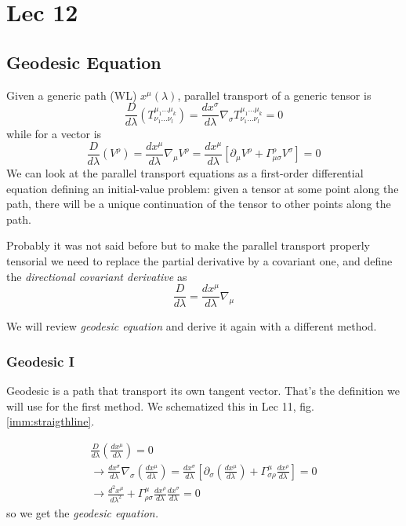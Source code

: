 \section{Lec 12}
\subsection{Geodesic Equation}
Given a generic path (WL) $x^{\mu }\left( \lambda  \right)$, parallel transport of a generic tensor is
\[
\frac{D}{d\lambda } \left( T^{\mu _{1}\ldots \mu _{k}}_{\nu _{1}\ldots \nu _{l}}\right) =\frac{d x^{\sigma }}{d \lambda } \nabla _{\sigma } T^{\mu _{1}\ldots \mu _{k}}_{\nu _{1}\ldots \nu _{l}} = 0		
\]
while for a vector is 
\[
	\frac{D}{d\lambda } \left( V^{\rho } \right) = \frac{d x^{\mu }}{d \lambda } \nabla _{\mu }V^{\rho } = \frac{d x^{\mu }}{d \lambda } \left[ \partial_{\mu }V^{\rho } + \Gamma ^{\rho }_{\mu \sigma  } V^{\sigma } \right]=0
\]
We can look at the parallel transport equations as a first-order differential equation defining an initial-value problem: given a tensor at some point along the path, there will be a unique continuation of the tensor to other points along the path.

Probably it was not said before but to make the parallel transport properly tensorial we need to replace the partial derivative by a covariant one, and define the \emph{directional covariant derivative} as
\[
\frac{D}{d\lambda } = \frac{d x^{\mu }}{d \lambda }\nabla _{\mu }
\]

We will review \emph{geodesic equation} and derive it again with a different method.

\subsubsection{Geodesic I}
Geodesic is a path that transport its own tangent vector. That's the definition we will use for the first method. We schematized this in Lec 11, fig. \ref{imm:straigthline}.

\begin{gather*}
\frac{D}{d\lambda } \left( \frac{d x^{\mu }}{d \lambda } \right) = 0 \\
\to  \frac{d x^{\sigma }}{d \lambda }\nabla _{\sigma }\left( \frac{d x^{\mu }}{d \lambda } \right) = \frac{d x^{\sigma }}{d \lambda }\left[ \partial_{\sigma } \left( \frac{d x^{\mu }}{d \lambda } \right) + \Gamma ^{\mu }_{\sigma \rho } \frac{d x^{\rho }}{d \lambda } \right] = 0 \\
\to \frac{d ^{2} x^{\mu }}{d \lambda ^{2}} + \Gamma ^{\mu }_{\rho \sigma } \frac{d x^{\rho }}{d \lambda } \frac{d x^{\sigma }}{d \lambda } = 0 
\end{gather*}
so we get the \emph{geodesic equation.}

